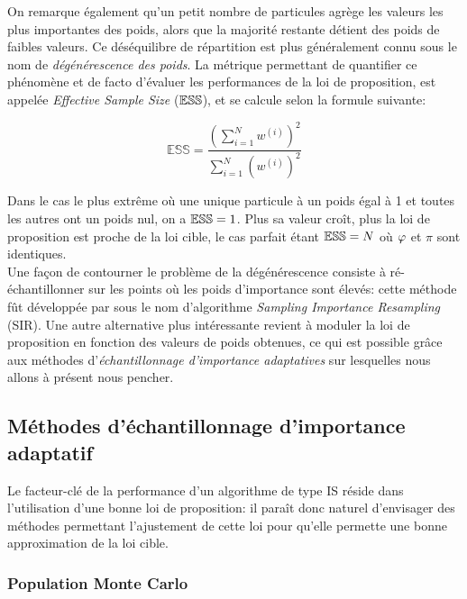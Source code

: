  On remarque également qu'un petit nombre de particules agrège les valeurs les plus importantes des poids, alors que la majorité restante détient des poids de faibles valeurs. Ce déséquilibre de répartition est plus généralement connu sous le nom de \textit{dégénérescence des poids}. La métrique permettant de quantifier ce phénomène et de facto d'évaluer les performances de la loi de proposition, est appelée \textit{Effective Sample Size} (${\mathbb{ESS}}$), et se calcule selon la formule suivante:

\begin{equation}
\mathbb{ESS} = \dfrac{\left(\sum\limits_{i=1}^N w^{(i)}\right)^2}{\sum\limits_{i=1}^N \left(w^{(i)}\right)^2}
\label{eq_def_ESS}
\end{equation}

Dans le cas le plus extrême où une unique particule à un poids égal à 1 et toutes les autres ont un poids nul, on a ${\mathbb{ESS}} = 1$. Plus sa valeur croît, plus la loi de proposition est proche de la loi cible, le cas parfait étant ${\mathbb{ESS}} = N$ où ${\varphi}$ et $\pi$ sont identiques.\\

Une façon de contourner le problème de la dégénérescence consiste à ré-échantillonner sur les points où les poids d'importance sont élevés: cette méthode fût développée par \cite{Rubin1988} sous le nom d'algorithme \textit{Sampling Importance Resampling} (SIR). Une autre alternative {plus intéressante} revient à moduler la loi de proposition en fonction des valeurs de poids obtenues, ce qui est possible grâce aux méthodes d'\textit{échantillonnage d'importance adaptatives} sur lesquelles nous allons à présent nous pencher.\\

\subsection{Méthodes d'échantillonnage d'importance adaptatif}

Le facteur-clé de la performance d'un algorithme de type IS réside dans l'utilisation d'une bonne loi de proposition: il paraît donc naturel d'envisager des méthodes permettant l'ajustement de cette loi pour qu'elle permette une bonne approximation de la loi cible. \\

\subsubsection{Population Monte Carlo}

